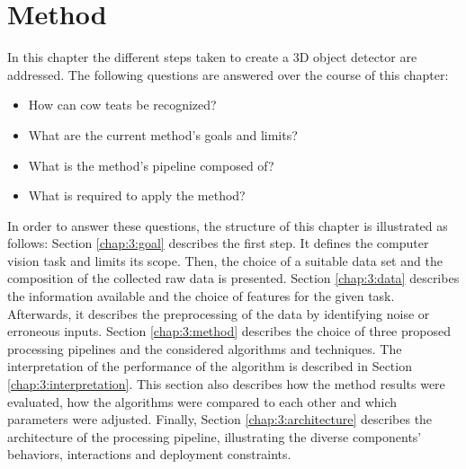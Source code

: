 \chapter{Method}\label{chap:design}
\label{Background}
In this chapter the different steps taken to create a 3D object detector are addressed. The following questions are answered over the course of this chapter:
\begin{itemize}
    \item How can cow teats be recognized?
    \item What are the current method's goals and limits?
    \item What is the method's pipeline composed of?
    \item What is required to apply the method?
\end{itemize}
In order to answer these questions, the structure of this chapter is illustrated as follows: Section \ref{chap:3:goal} describes the first step. It defines the computer vision task and limits its scope. Then, the choice of a suitable data set and the composition of the collected raw data is presented. Section \ref{chap:3:data} describes the information available and the choice of features for the given task. Afterwards, it describes the preprocessing of the data by identifying noise or erroneous inputs. Section \ref{chap:3:method} describes the choice of three proposed processing pipelines and the considered algorithms and techniques.  The interpretation of the performance of the algorithm is described in Section \ref{chap:3:interpretation}. This section also describes how the method results were evaluated, how the algorithms were compared to each other and which parameters were adjusted. Finally, Section \ref{chap:3:architecture} describes the architecture of the processing pipeline, illustrating the diverse components' behaviors, interactions and deployment constraints.

%  
